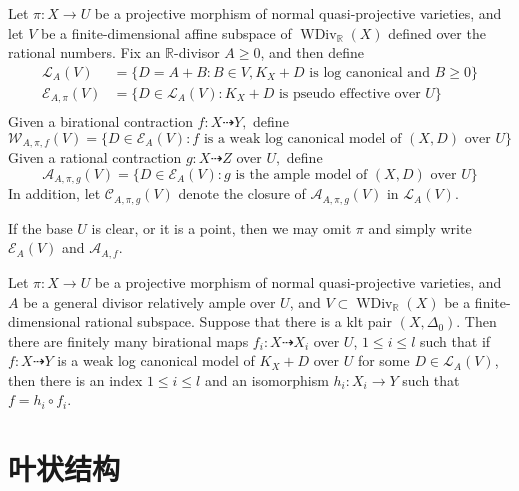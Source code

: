 \begin{definition}\label{polytopeofdivisor}
	\cite[Definition 1.1.4]{BCHM10} Let $ \pi: X\to U $ be a projective morphism of normal quasi-projective varieties, and let $ V $ be a finite-dimensional affine subspace of $ \operatorname{WDiv}_{\mathbb{R}}(X) $ defined over the rational numbers. Fix an $ \mathbb{R} $-divisor $ A\geqslant 0 $, and then define
	\[
		\begin{aligned}
			\mathcal{L}_A(V)       & =\{D=A+B:B \in V,  K_X+D \text{ is log canonical and  } B\geqslant0 \} \\
			\mathcal{E}_{A,\pi}(V) & =\{D\in \mathcal{L}_A(V): K_X+D \text{ is pseudo effective over } U\}  \\
		\end{aligned}
	\]
	Given a birational contraction $ f:X \dashrightarrow Y,$ define
	\[ \mathcal{W}_{A,\pi,f}(V)=\{D\in \mathcal{E}_{A}(V): f \text{ is a weak log canonical model of  } (X,D) \text{ over }U\} \]
	Given a rational contraction $g:X\dashrightarrow Z  $ over $ U, $ define
	\[ \mathcal{A}_{A,\pi,g}(V)=\{D\in \mathcal{E}_{A}(V): g \text{ is the ample model of  } (X,D) \text{ over }U\} \]
	In addition, let $ \mathcal{C}_{A,\pi,g}(V) $ denote the closure of $ \mathcal{A}_{A,\pi,g}(V) $ in $\mathcal{L}_{A}(V)$.

	If the base $U$ is clear, or it is a point, then we may omit $\pi$ and simply write $\mathcal{E}_{A}(V)$ and $\mathcal{A}_{A,f}$.
\end{definition}

\begin{theorem}\label{finitewlcm}

	Let $\pi: X\to U$ be a projective morphism of normal quasi-projective varieties, and $A$ be a general divisor relatively ample over $U$, and $V \subset \operatorname{WDiv}_{\mathbb{R}}(X)$ be a finite-dimensional rational subspace. Suppose that there is a klt pair $(X,\Delta_{0})$. Then there are finitely many birational maps $f_{i}:X \dashrightarrow X_{i}$ over $U$, $1\leqslant i\leqslant l$ such that if $f:X \dashrightarrow  Y$ is a weak log canonical model of $K_{X}+D$ over $U$ for some $D \in \mathcal{L}_{A}(V)$, then there is an index $1\leqslant i\leqslant l$ and an  isomorphism  $h_{i}:X_{i} \to Y$  such that $f=h_{i}\circ f_{i}$.

\end{theorem}
\section{叶状结构}

